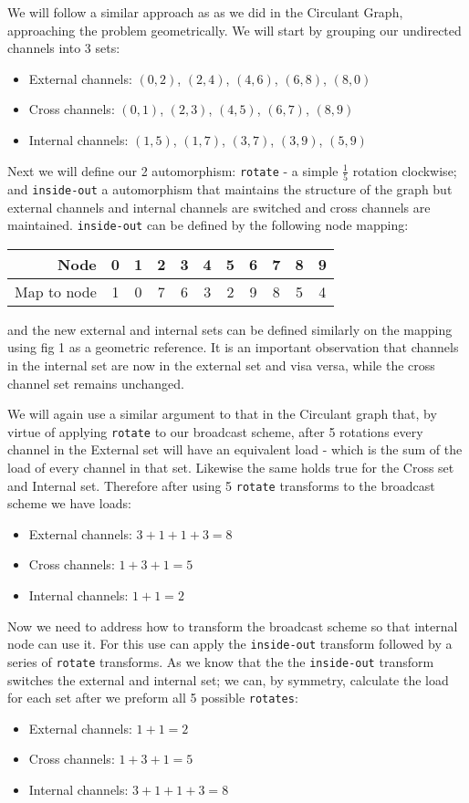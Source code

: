 We will follow a similar approach as as we did in the Circulant Graph, approaching the problem geometrically.
We will start by grouping our undirected channels into 3 sets: 
\begin{itemize}
    \item External channels: $(0,2)$, $(2,4)$, $(4,6)$, $(6,8)$, $(8,0)$ 
    \item Cross channels: $(0,1)$, $(2,3)$, $(4,5)$, $(6,7)$, $(8,9)$ 
    \item Internal channels: $(1,5)$, $(1,7)$, $(3,7)$, $(3,9)$, $(5,9)$
\end{itemize}
Next we will define our 2 automorphism: \texttt{rotate} - a simple $\frac{1}{5}$ rotation clockwise; and \texttt{inside-out} a automorphism that maintains the structure of the graph but external channels and internal channels are switched and cross channels are maintained.
\texttt{inside-out} can be defined by the following node mapping: 
\begin{center}
\begin{tabular}{r|cccccccccc}
 Node  &0& 1 & 2 & 3 & 4 & 5 & 6 & 7 & 8 & 9\\
 \hline
 Map to node  & 1 & 0 & 7 & 6 & 3 & 2 & 9 & 8 & 5 & 4 \\
\end{tabular}
\end{center}
and the new external and internal sets can be defined similarly on the mapping using fig 1 as a geometric reference.
It is an important observation that channels in the internal set are now in the external set and visa versa, while the cross channel set remains unchanged.

We will again use a similar argument to that in the Circulant graph that, by virtue of applying \texttt{rotate} to our broadcast scheme, after 5 rotations every channel in the External set will have an equivalent load - which is the sum of the load of every channel in that set.
Likewise the same holds true for the Cross set and Internal set.
Therefore after using 5 \texttt{rotate} transforms to the broadcast scheme we have loads:
\begin{itemize}
    \item External channels: $3+1+1+3=8$ 
    \item Cross channels: $1+3+1=5$ 
    \item Internal channels: $1+1=2$
\end{itemize}
Now we need to address how to transform the broadcast scheme so that internal node can use it.
For this use can apply the \texttt{inside-out} transform followed by a series of \texttt{rotate} transforms.
As we know that the the \texttt{inside-out} transform switches the external and internal set; we can, by symmetry, calculate the load for each set after we preform all 5 possible \texttt{rotates}:
\begin{itemize}
    \item External channels:  $1+1=2$
    \item Cross channels: $1+3+1=5$ 
    \item Internal channels: $3+1+1+3=8$
\end{itemize}

